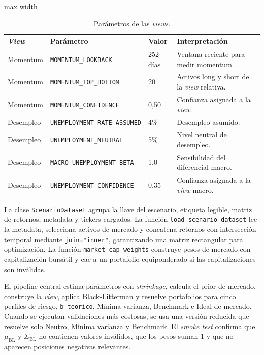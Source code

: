 \begin{table}[H]
\centering
\caption{Par\'ametros de las \textit{views}.}
\label{tab:anexo4_bl_parametros_views}
\small
\begin{adjustbox}{max width=\textwidth}
\begin{tabular}{@{}p{}p{}p{}p{}@{}}
\toprule
\textit{View} & Par\'ametro & Valor & Interpretaci\'on \\
\midrule
Momentum & \texttt{MOMENTUM\_LOOKBACK} & 252 d\'ias & Ventana reciente para medir momentum. \\
Momentum & \texttt{MOMENTUM\_TOP\_BOTTOM} & 20 & Activos long y short de la \textit{view} relativa. \\
Momentum & \texttt{MOMENTUM\_CONFIDENCE} & 0,50 & Confianza asignada a la \textit{view}. \\
Desempleo & \texttt{UNEMPLOYMENT\_RATE\_ASSUMED} & 4\% & Desempleo asumido. \\
Desempleo & \texttt{UNEMPLOYMENT\_NEUTRAL} & 5\% & Nivel neutral de desempleo. \\
Desempleo & \texttt{MACRO\_UNEMPLOYMENT\_BETA} & 1,0 & Sensibilidad del diferencial macro. \\
Desempleo & \texttt{UNEMPLOYMENT\_CONFIDENCE} & 0,35 & Confianza asignada a la \textit{view} macro. \\
\bottomrule
\end{tabular}
\end{adjustbox}
\end{table}

La clase \texttt{ScenarioDataset} agrupa la llave del escenario, etiqueta
legible, matriz de retornos, metadata y tickers cargados. La funci\'on
\texttt{load\_scenario\_dataset} lee la metadata, selecciona activos de mercado
y concatena retornos con intersecci\'on temporal mediante \texttt{join="inner"},
garantizando una matriz rectangular para optimizaci\'on. La funci\'on
\texttt{market\_cap\_weights} construye pesos de mercado con capitalizaci\'on
burs\'atil y cae a un portafolio equiponderado si las capitalizaciones son
inv\'alidas.

El pipeline central estima par\'ametros con \textit{shrinkage}, calcula el prior
de mercado, construye la \textit{view}, aplica Black-Litterman y resuelve
portafolios para cinco perfiles de riesgo, \texttt{b\_teorico}, M\'inima
varianza, Benchmark e Ideal de mercado. Cuando se ejecutan validaciones m\'as
costosas, se usa una versi\'on reducida que resuelve solo Neutro, M\'inima
varianza y Benchmark. El \textit{smoke test} confirma que $\mu_{\text{BL}}$ y
$\Sigma_{\text{BL}}$ no contienen valores inv\'alidos, que los pesos suman 1 y
que no aparecen posiciones negativas relevantes.

